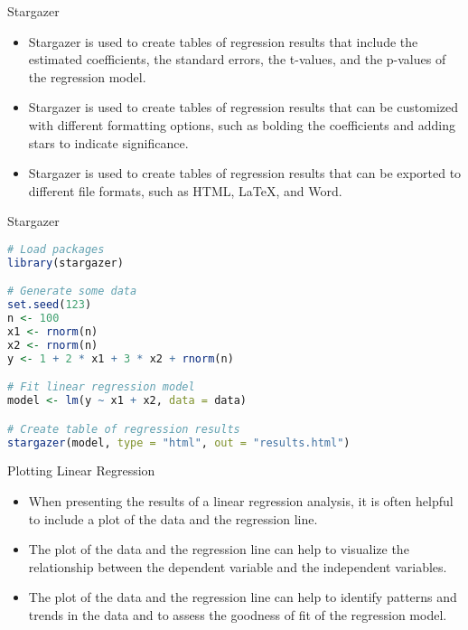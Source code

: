 \documentclass[serif, 9pt, aspectratio=32]{beamer}
\begin{document}
\begin{frame}{Stargazer}
    \begin{itemize}
        \setlength{\itemsep}{2em}
        \item Stargazer is used to create tables of regression results that include the estimated coefficients, the standard errors, the t-values, and the p-values of the regression model.
        \item Stargazer is used to create tables of regression results that can be customized with different formatting options, such as bolding the coefficients and adding stars to indicate significance.
        \item Stargazer is used to create tables of regression results that can be exported to different file formats, such as HTML, LaTeX, and Word.
    \end{itemize}
\end{frame}

\begin{frame}[fragile]{Stargazer}
    \begin{lstlisting}[language=R]
# Load packages
library(stargazer)

# Generate some data
set.seed(123)
n <- 100
x1 <- rnorm(n)
x2 <- rnorm(n)
y <- 1 + 2 * x1 + 3 * x2 + rnorm(n)

# Fit linear regression model
model <- lm(y ~ x1 + x2, data = data)

# Create table of regression results
stargazer(model, type = "html", out = "results.html")
    \end{lstlisting}
\end{frame}

\begin{frame}{Plotting Linear Regression}
    \begin{itemize}
        \setlength{\itemsep}{2em}
        \item When presenting the results of a linear regression analysis, it is often helpful to include a plot of the data and the regression line.
        \item The plot of the data and the regression line can help to visualize the relationship between the dependent variable and the independent variables.
        \item The plot of the data and the regression line can help to identify patterns and trends in the data and to assess the goodness of fit of the regression model.
    \end{itemize}
\end{frame}
\end{document}
